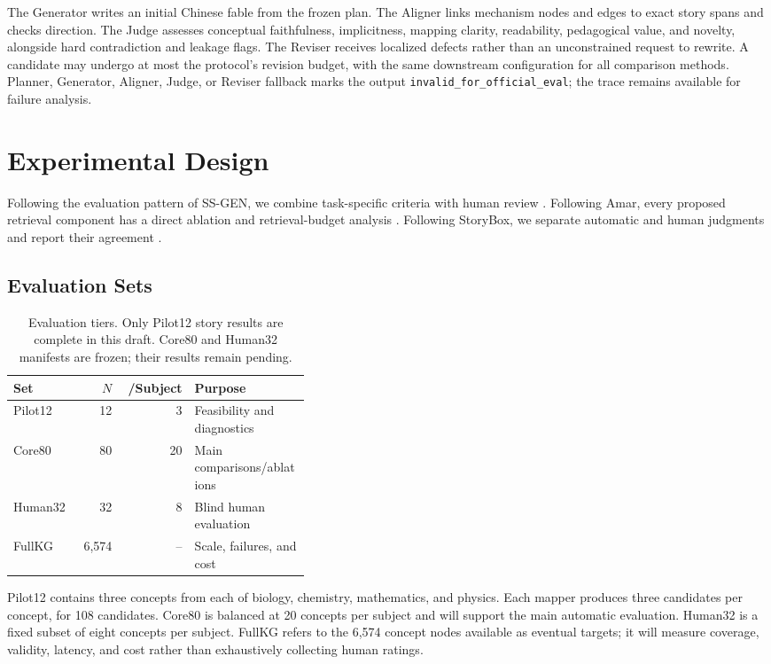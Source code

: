 \documentclass[letterpaper]{article} %
\begin{document}
The Generator writes an initial Chinese fable from the frozen plan. The Aligner links mechanism nodes and edges to exact story spans and checks direction. The Judge assesses conceptual faithfulness, implicitness, mapping clarity, readability, pedagogical value, and novelty, alongside hard contradiction and leakage flags. The Reviser receives localized defects rather than an unconstrained request to rewrite. A candidate may undergo at most the protocol's revision budget, with the same downstream configuration for all comparison methods. Planner, Generator, Aligner, Judge, or Reviser fallback marks the output \texttt{invalid\_for\_official\_eval}; the trace remains available for failure analysis.

\section{Experimental Design}

Following the evaluation pattern of SS-GEN, we combine task-specific criteria with human review \citep{feng2025ssgen}. Following Amar, every proposed retrieval component has a direct ablation and retrieval-budget analysis \citep{xu2025amar}. Following StoryBox, we separate automatic and human judgments and report their agreement \citep{chen2026storybox}.

\subsection{Evaluation Sets}

\begin{table}[t]
\centering
\small
\begin{tabular}{lrrp{0.39\linewidth}}
\toprule
Set & $N$ & /Subject & Purpose \\
\midrule
Pilot12 & 12 & 3 & Feasibility and diagnostics \\
Core80 & 80 & 20 & Main comparisons/ablations \\
Human32 & 32 & 8 & Blind human evaluation \\
FullKG & 6,574 & -- & Scale, failures, and cost \\
\bottomrule
\end{tabular}
\caption{Evaluation tiers. Only Pilot12 story results are complete in this draft. Core80 and Human32 manifests are frozen; their results remain pending.}
\label{tab:sets}
\end{table}

Pilot12 contains three concepts from each of biology, chemistry, mathematics, and physics. Each mapper produces three candidates per concept, for 108 candidates. Core80 is balanced at 20 concepts per subject and will support the main automatic evaluation. Human32 is a fixed subset of eight concepts per subject. FullKG refers to the 6,574 concept nodes available as eventual targets; it will measure coverage, validity, latency, and cost rather than exhaustively collecting human ratings.
\end{document}
